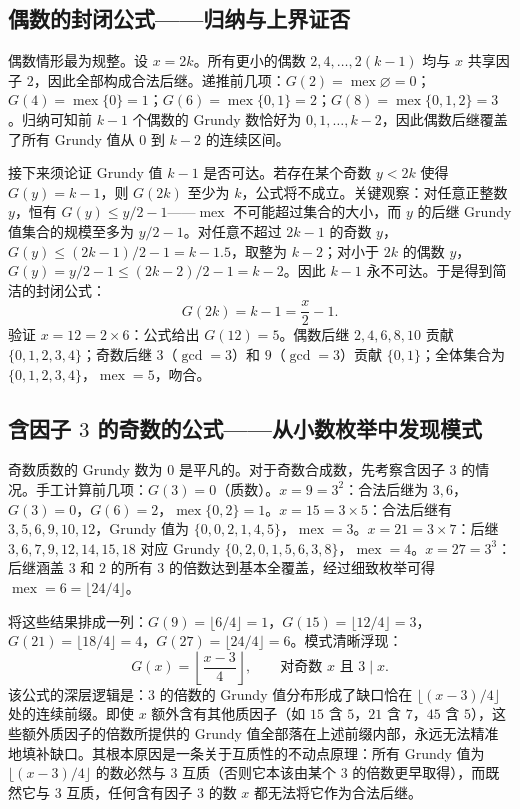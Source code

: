 \subsection{偶数的封闭公式——归纳与上界证否}

偶数情形最为规整。设 $x = 2k$。所有更小的偶数 $2, 4, \dots, 2(k-1)$ 均与 $x$ 共享因子 $2$，因此全部构成合法后继。递推前几项：$G(2) = \operatorname{mex}\varnothing = 0$；$G(4) = \operatorname{mex}\{0\} = 1$；$G(6) = \operatorname{mex}\{0, 1\} = 2$；$G(8) = \operatorname{mex}\{0, 1, 2\} = 3$。归纳可知前 $k-1$ 个偶数的 Grundy 数恰好为 $0, 1, \dots, k-2$，因此偶数后继覆盖了所有 Grundy 值从 $0$ 到 $k-2$ 的连续区间。

接下来须论证 Grundy 值 $k-1$ 是否可达。若存在某个奇数 $y < 2k$ 使得 $G(y) = k-1$，则 $G(2k)$ 至少为 $k$，公式将不成立。关键观察：对任意正整数 $y$，恒有 $G(y) \le y/2 - 1$——$\operatorname{mex}$ 不可能超过集合的大小，而 $y$ 的后继 Grundy 值集合的规模至多为 $y/2 - 1$。对任意不超过 $2k-1$ 的奇数 $y$，$G(y) \le (2k-1)/2 - 1 = k - 1.5$，取整为 $k-2$；对小于 $2k$ 的偶数 $y$，$G(y) = y/2 - 1 \le (2k-2)/2 - 1 = k-2$。因此 $k-1$ 永不可达。于是得到简洁的封闭公式：
\[
G(2k) = k - 1 = \frac{x}{2} - 1.
\]
验证 $x = 12 = 2 \times 6$：公式给出 $G(12) = 5$。偶数后继 $2, 4, 6, 8, 10$ 贡献 $\{0, 1, 2, 3, 4\}$；奇数后继 $3$（$\gcd=3$）和 $9$（$\gcd=3$）贡献 $\{0, 1\}$；全体集合为 $\{0, 1, 2, 3, 4\}$，$\operatorname{mex}=5$，吻合。

\subsection{含因子 $3$ 的奇数的公式——从小数枚举中发现模式}

奇数质数的 Grundy 数为 $0$ 是平凡的。对于奇数合成数，先考察含因子 $3$ 的情况。手工计算前几项：$G(3) = 0$（质数）。$x = 9 = 3^2$：合法后继为 $3, 6$，$G(3) = 0$，$G(6) = 2$，$\operatorname{mex}\{0, 2\} = 1$。$x = 15 = 3 \times 5$：合法后继有 $3, 5, 6, 9, 10, 12$，Grundy 值为 $\{0, 0, 2, 1, 4, 5\}$，$\operatorname{mex} = 3$。$x = 21 = 3 \times 7$：后继 $3, 6, 7, 9, 12, 14, 15, 18$ 对应 Grundy $\{0, 2, 0, 1, 5, 6, 3, 8\}$，$\operatorname{mex} = 4$。$x = 27 = 3^3$：后继涵盖 $3$ 和 $2$ 的所有 $3$ 的倍数达到基本全覆盖，经过细致枚举可得 $\operatorname{mex} = 6 = \lfloor 24/4 \rfloor$。

将这些结果排成一列：$G(9) = \lfloor 6/4 \rfloor = 1$，$G(15) = \lfloor 12/4 \rfloor = 3$，$G(21) = \lfloor 18/4 \rfloor = 4$，$G(27) = \lfloor 24/4 \rfloor = 6$。模式清晰浮现：
\[
G(x) = \left\lfloor \frac{x - 3}{4} \right\rfloor, \qquad \text{对奇数 $x$ 且 $3 \mid x$}.
\]
该公式的深层逻辑是：$3$ 的倍数的 Grundy 值分布形成了缺口恰在 $\lfloor (x-3)/4 \rfloor$ 处的连续前缀。即使 $x$ 额外含有其他质因子（如 $15$ 含 $5$，$21$ 含 $7$，$45$ 含 $5$），这些额外质因子的倍数所提供的 Grundy 值全部落在上述前缀内部，永远无法精准地填补缺口。其根本原因是一条关于互质性的不动点原理：所有 Grundy 值为 $\lfloor (x-3)/4 \rfloor$ 的数必然与 $3$ 互质（否则它本该由某个 $3$ 的倍数更早取得），而既然它与 $3$ 互质，任何含有因子 $3$ 的数 $x$ 都无法将它作为合法后继。

